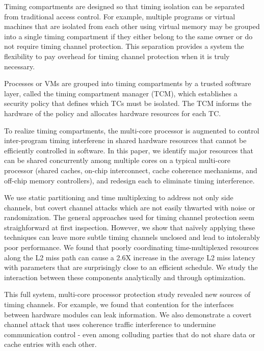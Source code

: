 Timing compartments are designed so that timing isolation can be
separated from traditional access control. For example, multiple programs or
virtual machines that are isolated from each other using virtual memory may
be grouped into a single timing compartment if they either belong to the 
same owner or do not require timing channel protection. 
This separation provides a system the flexibility to pay overhead for
timing channel protection when it is truly necessary.

Processes or VMs are grouped into timing compartments by a trusted software 
layer, called the timing compartment manager (TCM), which establishes a 
security policy that defines which TCs must be isolated. The TCM informs the 
hardware of the policy and allocates hardware resources for each TC.

To realize timing compartments, the multi-core processor is augmented 
to control inter-program timing interferenc in shared hardware
resources that cannot be efficiently controlled in software.
In this paper, we identify major resources that can be shared concurrently among
multiple cores on a typical multi-core processor (shared caches,
on-chip interconnect, cache coherence mechanisms, and off-chip memory 
controllers), and redesign each to eliminate timing interference.

We use static partitioning and time multiplexing to address not only 
side channels, but covert channel attacks which are not easily thwarted with 
noise or randomization. The general approaches used for timing channel 
protection seem straighforward at first inspection. However, we show that 
naïvely applying these techniques can leave more subtle timing channels 
unclosed and lead to intolerably poor performance. We found that poorly 
coordinating time-multiplexed resources along the L2 miss path can cause a 2.6X 
increase in the average L2 miss latency with parameters that are 
surprisingly close to an efficient schedule. We study the interaction between 
these components analytically and through optimization.

This full system, multi-core processor protection study revealed new sources
of timing channels.
For example, we found that contention for the interfaces between hardware 
modules can leak information.
We also demonstrate a covert channel attack that uses coherence traffic interference to 
undermine communication control - even among colluding parties that do not 
share data or cache entries with each other.


